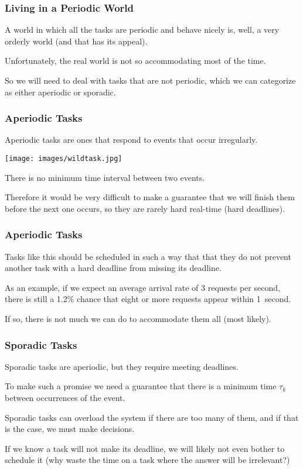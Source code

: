 \begin{frame}
\frametitle{Living in a Periodic World}

A world in which all the tasks are periodic and behave nicely is, well, a very orderly world (and that has its appeal). 

Unfortunately, the real world is not so accommodating most of the time. 

So we will need to deal with tasks that are not periodic, which we can categorize as either \alert{aperiodic} or \alert{sporadic}.

\end{frame}

\begin{frame}
\frametitle{Aperiodic Tasks}

Aperiodic tasks are ones that respond to events that occur irregularly. 

\begin{center}
	\texttt{[image: images/wildtask.jpg]}
\end{center}

There is no minimum time interval between two events.

Therefore it would be very difficult to make a guarantee that we will finish them before the next one occurs, so they are rarely hard real-time (hard deadlines). 

\end{frame}

\begin{frame}
\frametitle{Aperiodic Tasks}

Tasks like this should be scheduled in such a way that that they do not prevent another task with a hard deadline from missing its deadline. 

As an example, if we expect an average arrival rate of 3 requests per second, there is still a 1.2\% chance that eight or more requests appear within 1~second. 

If so, there is not much we can do to accommodate them all (most likely).

\end{frame}

\begin{frame}
\frametitle{Sporadic Tasks}

Sporadic tasks are aperiodic, but they require meeting deadlines. 

To make such a promise we need a guarantee that there is a minimum time $\tau_{k}$ between occurrences of the event. 

Sporadic tasks can overload the system if there are too many of them, and if that is the case, we must make decisions. 

If we know a task will not make its deadline, we will likely not even bother to schedule it (why waste the time on a task where the answer will be irrelevant?)


\end{frame}

